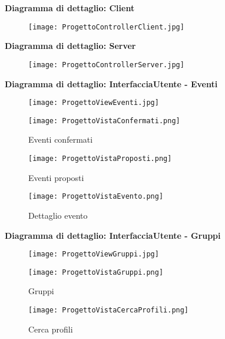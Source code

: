\newpage

\textbf{Diagramma di dettaglio: Client}
\begin{figure}[h!]
    \begin{center}
        \texttt{[image: ProgettoControllerClient.jpg]}
    \end{center}
\end{figure}


\newpage

\textbf{Diagramma di dettaglio: Server}
\begin{figure}[h!]
    \begin{center}
        \texttt{[image: ProgettoControllerServer.jpg]}
    \end{center}
\end{figure}

\newpage



\textbf{Diagramma di dettaglio: InterfacciaUtente - Eventi}
\begin{figure}[h!]
    \begin{center}
        \texttt{[image: ProgettoViewEventi.jpg]}
    \end{center}
\end{figure}
\begin{figure}[h!]
    \centering
    \texttt{[image: ProgettoVistaConfermati.png]}
    \caption{Eventi confermati}
\end{figure}
\begin{figure}[h!]
    \centering
    \texttt{[image: ProgettoVistaProposti.png]}
    \caption{Eventi proposti}
\end{figure}
\begin{figure}[h!]
    \centering
    \texttt{[image: ProgettoVistaEvento.png]}
    \caption{Dettaglio evento}
\end{figure}
\clearpage

\textbf{Diagramma di dettaglio: InterfacciaUtente - Gruppi}
\begin{figure}[h!]
    \begin{center}
        \texttt{[image: ProgettoViewGruppi.jpg]}
    \end{center}
\end{figure}
\begin{figure}[h!]
    \centering
    \texttt{[image: ProgettoVistaGruppi.png]}
    \caption{Gruppi}
\end{figure}
\begin{figure}[h!]
    \centering
    \texttt{[image: ProgettoVistaCercaProfili.png]}
    \caption{Cerca profili}
\end{figure}
\clearpage

